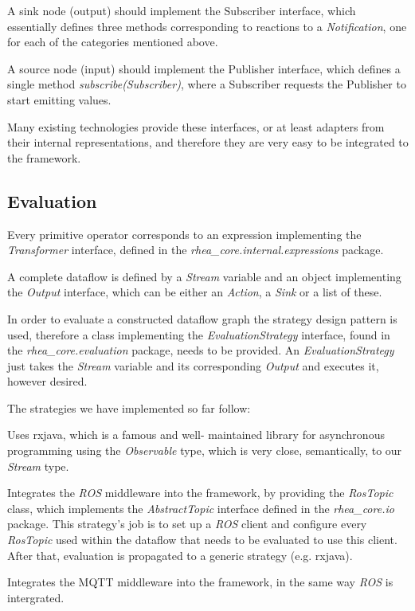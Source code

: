\documentclass[sigplan,review,anonymous]{acmart}
\begin{document}
A sink node (output) should implement the Subscriber interface, which
essentially defines three methods corresponding to reactions to a
\textit{Notification}, one for each of the categories mentioned above.

A source node (input) should implement the Publisher interface, which defines a
single method \textit{subscribe(Subscriber)}, where a Subscriber requests the
Publisher to start emitting values.

Many existing technologies provide these interfaces, or at least adapters from
their internal representations, and therefore they are very easy to be
integrated to the framework.

\subsection{Evaluation}

Every primitive operator corresponds to an expression implementing the
\textit{Transformer} interface, defined in the
\textit{rhea\_core.internal.expressions} package.

A complete dataflow is defined by a \textit{Stream} variable and an object
implementing the \textit{Output} interface, which can be either an
\textit{Action}, a \textit{Sink} or a list of these.

In order to evaluate a constructed dataflow graph the strategy design pattern is
used, therefore a class implementing the \textit{EvaluationStrategy} interface,
found in the \textit{rhea\_core.evaluation} package, needs to be provided. An
\textit{EvaluationStrategy} just takes the \textit{Stream} variable and its
corresponding \textit{Output} and executes it, however desired.

The strategies we have implemented so far follow:

\begin{description}[style=nextline]
\item[RxJavaEvaluationStrategy] Uses
rxjava, which is a famous and well-
maintained library for asynchronous programming using the \textit{Observable}
type, which is very close, semantically, to our \textit{Stream} type.

\item[RosEvaluationStrategy] Integrates the \textit{ROS} middleware into the
framework, by providing the \textit{RosTopic} class, which implements the
\textit{AbstractTopic} interface defined in the \textit{rhea\_core.io} package.
This strategy's job is to set up a \textit{ROS} client and configure every
\textit{RosTopic} used within the dataflow that needs to be evaluated to use
this client. After that, evaluation is propagated to a generic strategy (e.g.
rxjava).

\item[MqttEvaluationStrategy] Integrates the MQTT middleware into the framework,
in the same way \textit{ROS} is intergrated. \end{description}
\end{document}
